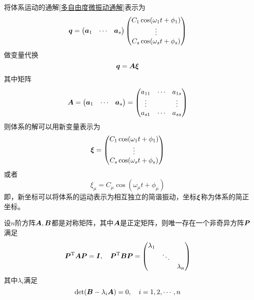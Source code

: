 将体系运动的通解\eqref{多自由度微振动通解}表示为
\begin{equation*}
	\boldsymbol{q} = \begin{pmatrix} \boldsymbol{a}_1 & \cdots & \boldsymbol{a}_s \end{pmatrix} \begin{pmatrix} C_1 \cos (\omega_1 t + \phi_1) \\ \vdots \\ C_s \cos (\omega_s t + \phi_s) \end{pmatrix}
\end{equation*}
做变量代换
\begin{equation*}
	\boldsymbol{q} = \boldsymbol{A} \boldsymbol{\xi}
\end{equation*}
其中矩阵
\begin{equation*}
	\boldsymbol{A} = \begin{pmatrix} \boldsymbol{a}_1 & \cdots & \boldsymbol{a}_s \end{pmatrix} = \begin{pmatrix} a_{11} & \cdots & a_{1s} \\ \vdots & & \vdots \\ a_{s1} & \cdots & a_{ss} \end{pmatrix}
\end{equation*}
则体系的解可以用新变量表示为
\begin{equation}
	\boldsymbol{\xi} = \begin{pmatrix} C_1 \cos (\omega_1 t + \phi_1) \\ \vdots \\ C_s \cos (\omega_s t + \phi_s) \end{pmatrix}
\end{equation}
或者
\begin{equation}
	\xi_\mu = C_\mu \cos (\omega_\mu t+ \phi_\mu)
\end{equation}
即，新坐标可以将体系的运动表示为相互独立的简谐振动，坐标$\boldsymbol{\xi}$称为体系的{\heiti 简正坐标}。

\begin{theorem}[同时对角化]
设$n$阶方阵$\boldsymbol{A},\boldsymbol{B}$都是对称矩阵，其中$\boldsymbol{A}$是正定矩阵，则唯一存在一个非奇异方阵$\boldsymbol{P}$满足
\begin{equation*}
	\boldsymbol{P}^{\mathrm{T}} \boldsymbol{A} \boldsymbol{P} = \boldsymbol{I},\quad \boldsymbol{P}^{\mathrm{T}} \boldsymbol{B} \boldsymbol{P} = \begin{pmatrix} \lambda_1 & & \\ & \ddots & \\ & & \lambda_n \end{pmatrix}
\end{equation*}
其中$\lambda_i$满足
\begin{equation*}
	\det(\boldsymbol{B} - \lambda_i \boldsymbol{A}) = 0,\quad i=1,2,\cdots,n
\end{equation*}
\end{theorem}

